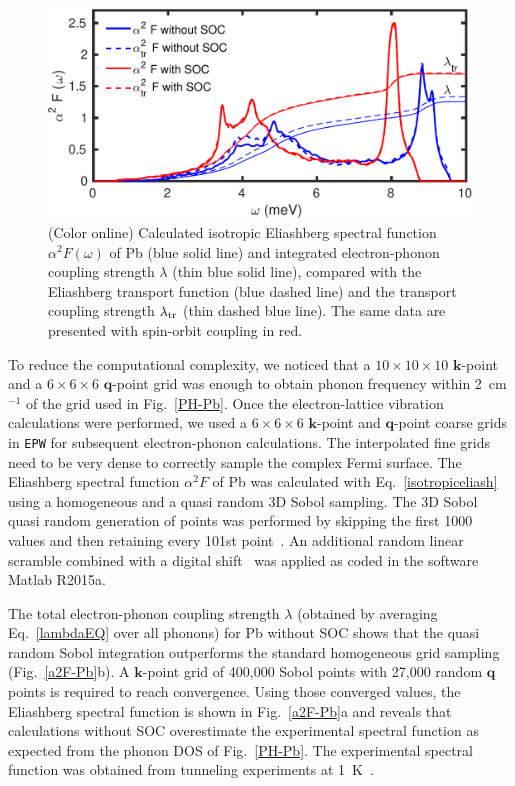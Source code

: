 \documentclass[final,3p,times,twocolumn]{elsarticle}
\begin{document}
\begin{figure}[b!]
  \centering
  \includegraphics[width=0.99\linewidth]{Pb_a2Fvstr.pdf}
  \caption{\label{a2F-Pbtr} (Color online) Calculated isotropic Eliashberg spectral function $\alpha^2 F(\omega)$ of Pb (blue solid line) and integrated electron-phonon coupling strength $\lambda$ (thin blue solid line), compared with the Eliashberg transport function (blue dashed line) and the transport coupling strength $\lambda_{\rm tr}$ (thin dashed blue line). The same data are presented with spin-orbit coupling in red. }
\end{figure}

To reduce the computational complexity, we noticed that a $10\times10\times10$ $\mathbf{k}$-point and a $6\times6\times6$ $\mathbf{q}$-point grid
was enough to obtain phonon frequency within 2~cm$^{-1}$ of the grid used in Fig.~\ref{PH-Pb}. 
Once the electron-lattice vibration calculations were performed, we used a $6\times6\times6$ $\mathbf{k}$-point and $\mathbf{q}$-point coarse grids  in \texttt{EPW} for subsequent electron-phonon calculations.    
The interpolated fine grids need to be very dense to correctly sample the complex Fermi surface. 
The Eliashberg spectral function $\alpha^2F$ of Pb was calculated with Eq.~\eqref{isotropiceliash} using a homogeneous and a quasi random 3D Sobol sampling.  
The 3D Sobol quasi random generation of points was performed by skipping the first 1000 values and then retaining every 101st point~\cite{Bratley1988}. An additional random linear scramble combined with a digital shift~\cite{Hong2003} was applied as coded in the software Matlab R2015a. 



The total electron-phonon coupling strength $\lambda$ (obtained by averaging Eq.~\eqref{lambdaEQ} over all phonons) for Pb without SOC shows that the quasi random Sobol integration outperforms the standard homogeneous grid sampling (Fig.~\ref{a2F-Pb}b). 
A $\mathbf{k}$-point grid of 400,000 Sobol points with 27,000 random $\mathbf{q}$ points is required to reach convergence. Using those converged values, the Eliashberg spectral function is shown in Fig.~\ref{a2F-Pb}a and reveals that calculations without SOC overestimate the experimental spectral function as expected from the phonon DOS of Fig.~\ref{PH-Pb}. The experimental spectral function was obtained from tunneling experiments at 1~K~\cite{Scalapino1969}. 
\end{document}
